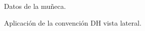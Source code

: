 \documentclass[a4paper,12pt]{article}
\begin{document}
\begin{figure}[H]
    \centering
    \begin{adjustbox}{scale = 0.65, max width=\columnwidth}
    \end{adjustbox}
    \caption{Datos de la muñeca.}
    \label{DH FANUC muñeca}
\end{figure}

\begin{figure}[H]
    \centering
    \begin{adjustbox}{scale = 0.9, max width=\columnwidth}
    \end{adjustbox}
    \caption{Aplicación de la convención DH vista lateral.}
    \label{DH FANUC lateral}
\end{figure}
\end{document}
